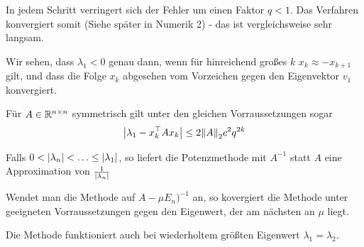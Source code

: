 \documentclass{report}
\begin{document}
	\begin{anmerkung}
		In jedem Schritt verringert sich der Fehler um einen Faktor $q < 1$. Das Verfahren konvergiert somit  (Siehe später in Numerik 2) - das ist vergleichsweise sehr langsam.
	\end{anmerkung}
	\begin{anmerkung}
		Wir sehen, dass $\lambda_1 < 0$ genau dann, wenn für hinreichend großes $k$ $x_k \approx -x_{k+1}$ gilt, und dass die Folge $x_k$ abgesehen vom Vorzeichen gegen den Eigenvektor $v_1$ konvergiert.
	\end{anmerkung}
	\begin{theorem}
		Für $A \in \mathbb{R}^{n \times n}$ symmetrisch gilt unter den gleichen Vorraussetzungen sogar
		\begin{align*}
			\abs{\lambda_1 - x_k^\top Ax_k} \leq 2 \norm{A}_2 c^2 q^{2k}
		\end{align*}
	\end{theorem}
	\begin{anmerkung}
		Falls $0 < \abs{\lambda_n} < \hdots \leq \abs{\lambda_1}$, so liefert die Potenzmethode mit $A^{-1}$ statt $A$ eine Approximation von $\frac{1}{\abs{\lambda_n}}$
	\end{anmerkung}
	\begin{anmerkung}
		Wendet man die Methode auf $A - \mu E_n)^{-1}$ an, so kovergiert die Methode unter geeigneten Vorraussetzungen gegen den Eigenwert, der am nächsten an $\mu$ liegt.
	\end{anmerkung}
	\begin{anmerkung}
		Die Methode funktioniert auch bei wiederholtem größten Eigenwert $\lambda_1 = \lambda_2$.
	\end{anmerkung}
\end{document}
